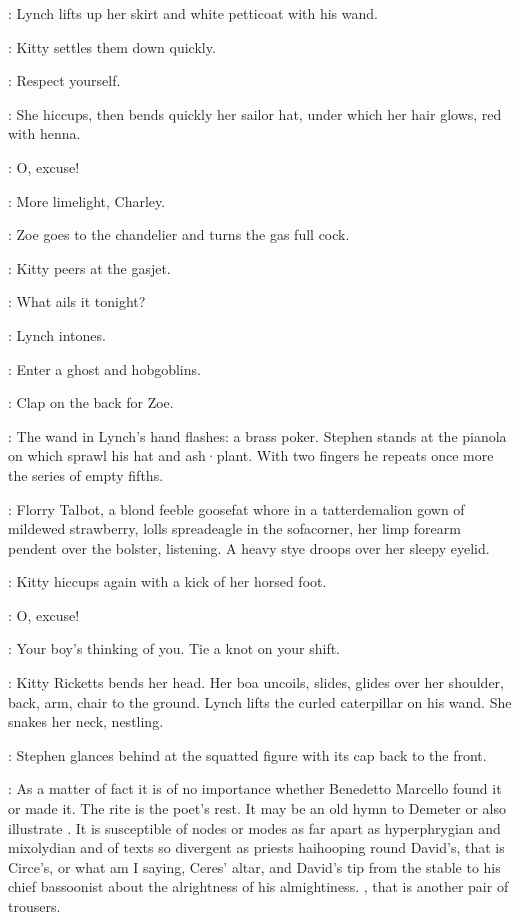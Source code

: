 :
Lynch lifts up her skirt and white petticoat with his wand.

:
Kitty settles them down quickly.

\Kitty:
Respect yourself.

:
She hiccups,
then bends quickly her sailor hat,
under which her hair glows,
red with henna.

\Kitty:
O,
excuse!

\Zoe:
More limelight,
Charley.

:
Zoe goes to the chandelier and turns the gas full cock.

:
Kitty peers at the gasjet.

\Kitty:
What ails it tonight?

:
Lynch intones.

\Lynch:
Enter a ghost and hobgoblins.

\Zoe:
Clap on the back for Zoe.

:
The wand in Lynch's hand flashes:
a brass poker.
Stephen stands at the pianola on which sprawl his hat and ash·plant.
With two fingers he repeats once more the series of empty fifths.

:
Florry Talbot,
a blond feeble goosefat whore
in a tatterdemalion gown of mildewed strawberry,
lolls spreadeagle in the sofacorner,
her limp forearm pendent over the bolster,
listening.
A heavy stye droops over her sleepy eyelid.

:
Kitty hiccups again with a kick of her horsed foot.

\Kitty:
O,
excuse!

\Zoe:
Your boy's thinking of you.
Tie a knot on your shift.

:
Kitty Ricketts bends her head.
Her boa uncoils,
slides,
glides over her shoulder,
back,
arm,
chair to the ground.
Lynch lifts the curled caterpillar on his wand.
She snakes her neck,
nestling.

:
Stephen glances behind at the squatted figure with its cap back to the front.

\Stephen:
As a matter of fact it is of no importance
whether Benedetto Marcello found it or made it.
The rite is the poet's rest.
It may be an old hymn to Demeter
or also illustrate .
It is susceptible of nodes or modes as far apart as hyperphrygian and mixolydian
and of texts so divergent as priests haihooping round David's,
that is Circe's,
or what am I saying,
Ceres' altar,
and David's tip from the stable to his chief bassoonist
about the alrightness of his almightiness.
,
that is another pair of trousers.

